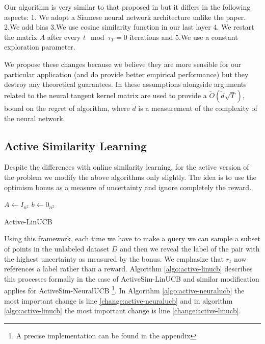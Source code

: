\documentclass{article}
\begin{document}
Our algorithm is very similar to that proposed in \cite{neuralucb} but it differs in the following aspects: 1. We adopt a Siamese neural network architecture unlike the paper.
2.We add bias 3.We use cosine similarity function in our last layer 4. We restart the matrix $A$ after every $t \mod \tau_T = 0$ iterations and 5.We use a constant exploration parameter.

We propose these changes because we believe they are more sensible for our particular application (and do provide better empirical performance) but they destroy any theoretical guarantees.
In \cite{neuralucb} these assumptions alongside arguments related to the  neural tangent kernel matrix \cite{neuraltangentkernel} are used to provide a $\tilde{O}(\tilde{d}\sqrt{T})$, bound on the regret of algorithm, where
$\tilde{d}$ is a measurement of the complexity of the neural network.


  \subsection{Active Similarity Learning}
  Despite the differences with online similarity learning, for the active version of the problem we modify the above algorithms only slightly.
  The idea is to use the optimism bonus as a measure of uncertainty and ignore completely the reward.
\begin{algorithm}
    $A \gets I_{n^2}$\;
    $b \gets 0_{n^2}$\;
    \caption{Active-LinUCB}\label{algo:active-linucb}
\end{algorithm}

Using this framework, each time we have to make a query we can sample a subset of points in the unlabeled dataset $D$  and then we reveal the label of the pair with the highest uncertainty as measured by the bonus.
We emphasize that $r_t$ now references a label rather than a reward.
Algorithm \ref{algo:active-linucb} describes this processes formally in the case of ActiveSim-LinUCB and similar modification applies for ActiveSim-NeuralUCB \footnote{A precise implementation can be found in the appendix}.
In Algorithm \ref{algo:active-neuralucb} the most important change is line \ref{change:active-neuralucb} and in algorithm
\ref{algo:active-linucb} the most important change is line \ref{change:active-linucb}.
\end{document}
